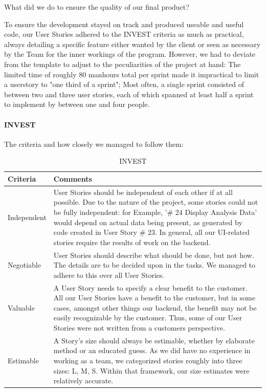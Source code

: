 
What did we do to ensure the quality of our final product? 

To ensure the development stayed on track and produced useable and useful code, our User Stories adhered to the INVEST criteria as much as practical, always detailing a specific feature either wanted by the client or seen as necessary by the Team for the inner workings of the program. 
However, we had to deviate from the template to adjust to the peculiarities of the project at hand:
The limited time of roughly 80 manhours total per sprint made it impractical to limit a userstory to "one third of a sprint"; Most often, a single sprint consisted of between two and three user stories, each of which spanned at least half a sprint to implement by between one and four people. 
\paragraph{INVEST} 
The criteria and how closely we managed to follow them:
\begin{table}[h!]
  \caption{INVEST}
  \label{INVEST}
  \centering
  \begin{tabular}{|p{3cm} | p{10cm}|}
	\hline  	 
  	 Criteria & Comments \\ 
  	 \hline
  	 \hline
  	Independent & User Stories should be independent of each other if at all possible. Due to the nature of the project, some stories could not be fully independent: for Example, '\# 24 Display Analysis Data' would depend on actual data being present, as generated by code created in User Story \# 23. In general, all our UI-related stories require the results of work on the backend.  \\ 
  	\hline
  	 Negotiable & User Stories should describe what should be done, but not how. The details are to be decided upon in the tasks. We managed to adhere to this over all User Stories.  \\ 
  	\hline
  	Valuable & A User Story needs to specify a clear benefit to the customer. All our User Stories have a benefit to the customer, but in some cases, amongst other things our backend, the benefit may not be easily recognizable by the customer. Thus, some of our User Stories were not written from a customers perspective. \\ 
  	\hline
  	Estimable & A Story's size should always be estimable, whether by elaborate method or an educated guess. As we did have no experience in working as a team, we categorized stories roughly into three sizes: L, M, S.  Within that framework, our size estimates were relatively accurate.   \\ 
  	\hline
  	  \end{tabular}
\end{table}
